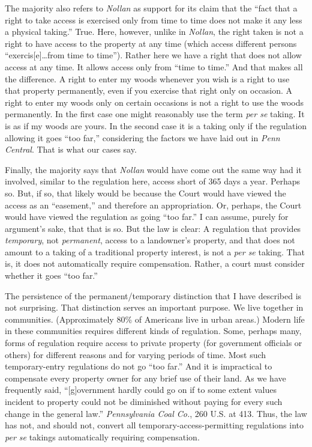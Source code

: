 The majority also refers to \textit{Nollan} as support for its claim that the
``fact that a right to take access is exercised only from time to time does not
make it any less a physical taking.'' True. Here, however, unlike in
\textit{Nollan}, the right taken is not a right to have access to the property
at any time (which access different persons ``exercis[e]\ldots from time to
time''). Rather here we have a right that does not allow access at any time. It
allows access only from ``time to time.'' And that makes all the difference. A
right to enter my woods whenever you wish is a right to use that property
permanently, even if you exercise that right only on occasion. A right to enter
my woods only on certain occasions is not a right to use the woods permanently.
In the first case one might reasonably use the term \textit{per se} taking. It
is as if my woods are yours. In the second case it is a taking only if the
regulation allowing it goes ``too far,'' considering the factors we have laid
out in \textit{Penn Central}. That is what our cases say.


Finally, the majority says that \textit{Nollan} would have come out the same way
had it involved, similar to the regulation here, access short of 365 days a
year. Perhaps so. But, if so, that likely would be because the Court would have
viewed the access as an ``easement,'' and therefore an appropriation. Or,
perhaps, the Court would have viewed the regulation as going ``too far.'' I can
assume, purely for argument's sake, that that is so. But the law is clear: A
regulation that provides \textit{temporary}, not \textit{permanent}, access to a
landowner's property, and that does not amount to a taking of a traditional
property interest, is not a \textit{per se} taking. That is, it does not
automatically require compensation. Rather, a court must consider whether it
goes ``too far.''



The persistence of the permanent/temporary distinction that I have described is
not surprising. That distinction serves an important purpose. We live together
in communities. (Approximately 80\% of Americans live in urban areas.) Modern
life in these communities requires different kinds of regulation. Some, perhaps
many, forms of regulation require access to private property (for government
officials or others) for different reasons and for varying periods of time. Most
such temporary-entry regulations do not go ``too far.'' And it is impractical to
compensate every property owner for any brief use of their land. As we have
frequently said, ``[g]overnment hardly could go on if to some extent values
incident to property could not be diminished without paying for every such
change in the general law.'' \textit{Pennsylvania Coal Co.}, 260 U.S. at 413.
Thus, the law has not, and should not, convert all temporary-access-permitting
regulations into \textit{per se} takings automatically requiring compensation. 


